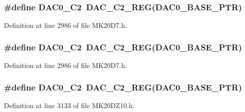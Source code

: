 \subsubsection[{\texorpdfstring{D\+A\+C0\+\_\+\+C2}{DAC0_C2}}]{\setlength{\rightskip}{0pt plus 5cm}\#define D\+A\+C0\+\_\+\+C2~{\bf D\+A\+C\+\_\+\+C2\+\_\+\+R\+EG}({\bf D\+A\+C0\+\_\+\+B\+A\+S\+E\+\_\+\+P\+TR})}\hypertarget{group___d_a_c___register___accessor___macros_ga1f3d911fd37856fcdd26fe596f884c09}{}\label{group___d_a_c___register___accessor___macros_ga1f3d911fd37856fcdd26fe596f884c09}


Definition at line 2986 of file M\+K20\+D7.\+h.

\subsubsection[{\texorpdfstring{D\+A\+C0\+\_\+\+C2}{DAC0_C2}}]{\setlength{\rightskip}{0pt plus 5cm}\#define D\+A\+C0\+\_\+\+C2~{\bf D\+A\+C\+\_\+\+C2\+\_\+\+R\+EG}({\bf D\+A\+C0\+\_\+\+B\+A\+S\+E\+\_\+\+P\+TR})}\hypertarget{group___d_a_c___register___accessor___macros_ga1f3d911fd37856fcdd26fe596f884c09}{}\label{group___d_a_c___register___accessor___macros_ga1f3d911fd37856fcdd26fe596f884c09}


Definition at line 2986 of file M\+K20\+D7.\+h.

\subsubsection[{\texorpdfstring{D\+A\+C0\+\_\+\+C2}{DAC0_C2}}]{\setlength{\rightskip}{0pt plus 5cm}\#define D\+A\+C0\+\_\+\+C2~{\bf D\+A\+C\+\_\+\+C2\+\_\+\+R\+EG}({\bf D\+A\+C0\+\_\+\+B\+A\+S\+E\+\_\+\+P\+TR})}\hypertarget{group___d_a_c___register___accessor___macros_ga1f3d911fd37856fcdd26fe596f884c09}{}\label{group___d_a_c___register___accessor___macros_ga1f3d911fd37856fcdd26fe596f884c09}


Definition at line 3133 of file M\+K20\+D\+Z10.\+h.


